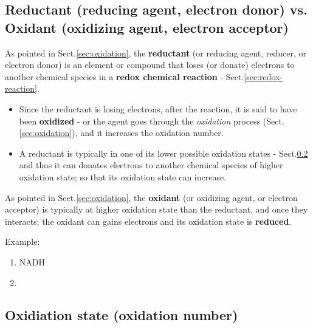 \subsection{Reductant (reducing agent, electron donor) vs. Oxidant (oxidizing
agent, electron acceptor)}
\label{sec:reductant}
\label{sec:oxidant}
\label{sec:reducing-agent}

As pointed in Sect.\ref{sec:oxidation}, the {\bf reductant} (or reducing agent,
reducer, or electron donor) is an element or compound that loses (or donate)
electrons to another chemical species in a {\bf redox chemical reaction} -
Sect.\ref{sec:redox-reaction}.

\begin{itemize}

  \item Since the reductant is losing electrons, after the reaction, it is said
  to have been {\bf oxidized} - or the agent goes through the {\it oxidation}
  process (Sect.\ref{sec:oxidation}), and it increases the oxidation number.

  \item A reductant is typically in one of its lower possible oxidation states -
Sect.\ref{sec:oxidation-state} and thus it can donates electrons to another
chemical species of higher oxidation state; so that its oxidation state can
increase.

\end{itemize}

As pointed in Sect.\ref{sec:oxidation}, the {\bf oxidant} (or oxidizing agent,
or electron acceptor) is typically at higher oxidation state than the reductant,
and once they interacts; the oxidant can gains electrons and its oxidation
state is {\bf reduced}.

Example:
\begin{enumerate}
  \item NADH
  \item {}
\end{enumerate}

\subsection{Oxidiation state (oxidation number)}
\label{sec:oxidation-state}


